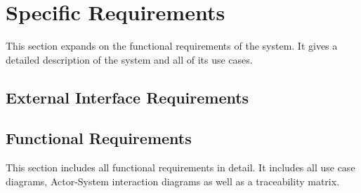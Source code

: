 \documentclass{article}
\begin{document}
	\section{Specific Requirements}
	This section expands on the functional requirements of the system. It gives a detailed 	description of the system and all of its use cases.
	
	\subsection{External Interface Requirements}
	
	\subsection{Functional Requirements}
	This section includes all functional requirements in detail. It includes all use case diagrams, Actor-System interaction diagrams as well as a traceability matrix.	
	
\end{document}
